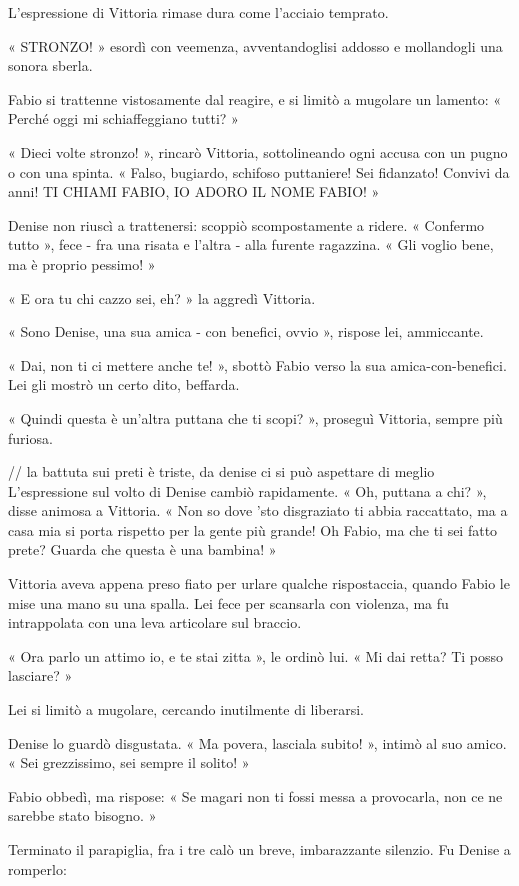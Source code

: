 L'espressione di Vittoria rimase dura come l'acciaio temprato.

« STRONZO! » esordì con veemenza, avventandoglisi addosso e mollandogli una sonora sberla.

Fabio si trattenne vistosamente dal reagire, e si limitò a mugolare un lamento: « Perché oggi mi schiaffeggiano tutti? »

« Dieci volte stronzo! », rincarò Vittoria, sottolineando ogni accusa con un pugno o con una spinta. « Falso, bugiardo, schifoso puttaniere! Sei fidanzato! Convivi da anni! TI CHIAMI FABIO, IO ADORO IL NOME FABIO! »

Denise non riuscì a trattenersi: scoppiò scompostamente a ridere. « Confermo tutto », fece - fra una risata e l'altra - alla furente ragazzina. « Gli voglio bene, ma è proprio pessimo! »

« E ora tu chi cazzo sei, eh? » la aggredì Vittoria.

« Sono Denise, una sua amica - con benefici, ovvio », rispose lei, ammiccante.

« Dai, non ti ci mettere anche te! », sbottò Fabio verso la sua amica-con-benefici. Lei gli mostrò un certo dito, beffarda.

« Quindi questa è un'altra puttana che ti scopi? », proseguì Vittoria, sempre più furiosa.

// la battuta sui preti è triste, da denise ci si può aspettare di meglio
L'espressione sul volto di Denise cambiò rapidamente. « Oh, puttana a chi? », disse animosa a Vittoria. « Non so dove 'sto disgraziato ti abbia raccattato, ma a casa mia si porta rispetto per la gente più grande! Oh Fabio, ma che ti sei fatto prete? Guarda che questa è una bambina! »

Vittoria aveva appena preso fiato per urlare qualche rispostaccia, quando Fabio le mise una mano su una spalla. Lei fece per scansarla con violenza, ma fu intrappolata con una leva articolare sul braccio.

« Ora parlo un attimo io, e te stai zitta », le ordinò lui. « Mi dai retta? Ti posso lasciare? »

Lei si limitò a mugolare, cercando inutilmente di liberarsi.

Denise lo guardò disgustata. « Ma povera, lasciala subito! », intimò al suo amico. « Sei grezzissimo, sei sempre il solito! »

Fabio obbedì, ma rispose: « Se magari non ti fossi messa a provocarla, non ce ne sarebbe stato bisogno. »

Terminato il parapiglia, fra i tre calò un breve, imbarazzante silenzio. Fu Denise a romperlo:

